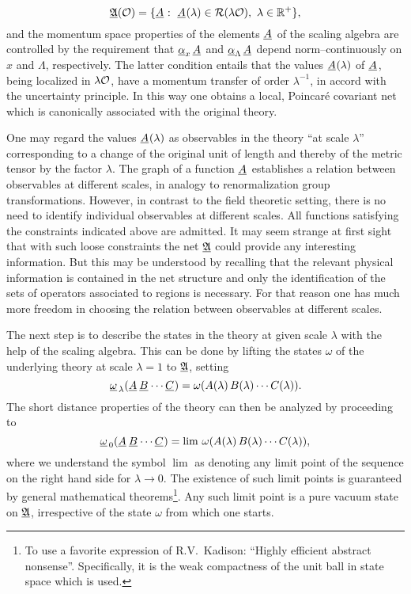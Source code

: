 \begin{equation}
\underline{{\mathfrak A}}({\cal O}) = \{ {\underline{A}_{}} : \ {\underline{A}_{}}(\lambda) \in  
{\cal R} (\lambda {\cal O}), \ \lambda \in {\Bbb R}^+ \},
\end{equation}
and the momentum space properties of the elements ${\underline{A}_{}}$ of the scaling algebra
are controlled by the requirement that 
$\underline{\alpha}_x \, {\underline{A}_{}} $  and $\underline{\alpha}_\Lambda \, {\underline{A}_{}}$ depend norm--continuously 
on $x$ and $\Lambda$, respectively. The latter condition entails 
that the values ${\underline{A}_{}}(\lambda)$ of ${\underline{A}_{}}$, being localized in
$\lambda {\cal O}$, have a momentum transfer 
of order $\lambda^{-1}$, in accord with 
the uncertainty principle. In this way 
one obtains a local, Poincar\'e covariant net
which is canonically associated with the original theory.

One may regard the values ${\underline{A}_{}}(\lambda)$ as observables in the theory
``at scale $\lambda$'' corresponding to a change of the original unit
of length and thereby of the metric tensor by the factor
$\lambda$. The graph of a function ${\underline{A}_{}}$ establishes a relation between
observables at different scales, in analogy to renormalization group
transformations. However, in contrast to the field theoretic setting,
there is no need to identify individual observables at different
scales. All functions satisfying the constraints indicated above are
admitted.  It may seem strange at first sight that with such loose
constraints the net $\underline{{\mathfrak A}}$ could provide any interesting
information. But this may be understood by recalling that  
the relevant physical information is contained in the net
structure and only the identification of the sets of operators associated to
regions is necessary. For that reason one has much more
freedom in choosing the relation between observables at different
scales. 

The next step is to describe the states in the theory at 
given scale $\lambda$ with the help of the scaling algebra. 
This can be done by lifting the states $\omega$ of the 
underlying theory at scale $\lambda = 1$ to $\underline{{\mathfrak A}}$, setting
\begin{equation}
\underline{\omega}_{\, \lambda} ({\underline{A}_{}} \, {\underline{B}_{}} \cdots {\underline{C}_{}}) = 
\omega(A(\lambda)  \, B(\lambda) \cdots C(\lambda)). 
\end{equation}
The short distance 
properties of the theory can then be analyzed by proceeding to 
\begin{equation}
\underline{\omega}_{\, 0} ({\underline{A}_{}} \, {\underline{B}_{}} \cdots {\underline{C}_{}}) = 
\lim \, \omega(A(\lambda)  \, B(\lambda) \cdots C(\lambda)), 
\end{equation}  
where we understand the symbol $\lim$ as denoting any limit point of the
sequence on the right hand side for $\lambda \to 0$. The existence of such
limit points is guaranteed by general mathematical
theorems\footnote{To use a favorite expression of R.V.\ Kadison:
``Highly efficient abstract nonsense''.  
Specifically, it is the weak compactness of the
unit ball in state space which is used.}. Any such limit point is 
a pure vacuum state on $\underline{{\mathfrak A}}$, irrespective of the state $\omega$ 
from which one starts.

